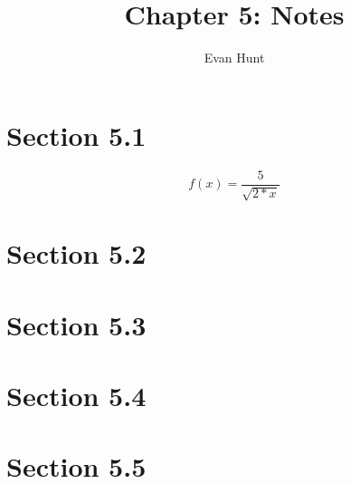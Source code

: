 \documentclass[12pt]{article}
\title{Chapter 5: Notes}
\author{Evan Hunt}
\begin{document}
    \maketitle

    \section[]{Section 5.1}
        \begin{equation}
            f(x) = \frac{5}{\sqrt{2*x}}
        \end{equation}
    \section[]{Section 5.2}
    \section[]{Section 5.3}
    \section[]{Section 5.4}
    \section[]{Section 5.5}
\end{document}
